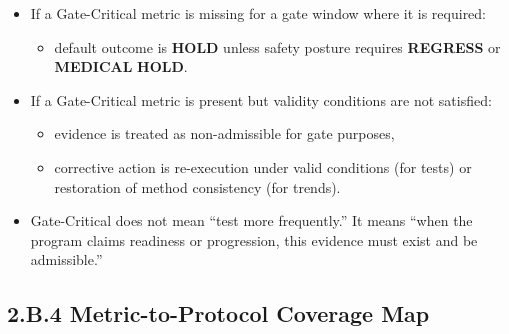 \documentclass[10pt]{article}
\begin{document}
\begin{itemize}
\item If a Gate-Critical metric is missing for a gate window where it is required:
  \begin{itemize}
  \item default outcome is \textbf{HOLD} unless safety posture requires \textbf{REGRESS} or \textbf{MEDICAL} \textbf{HOLD}.
  \end{itemize}
\item If a Gate-Critical metric is present but validity conditions are not satisfied:
  \begin{itemize}
  \item evidence is treated as non-admissible for gate purposes,
  \item corrective action is re-execution under valid conditions (for tests) or restoration of method consistency (for trends).
  \end{itemize}
\item Gate-Critical does not mean “test more frequently.” It means “when the program claims readiness or progression, this evidence must exist and be admissible.”
\end{itemize}

\newpage

\subsection*{2.B.4 Metric-to-Protocol Coverage Map}
{}

\begingroup
\scriptsize
\setlength{\tabcolsep}{2pt}
\renewcommand{\arraystretch}{1.12}
\end{document}
